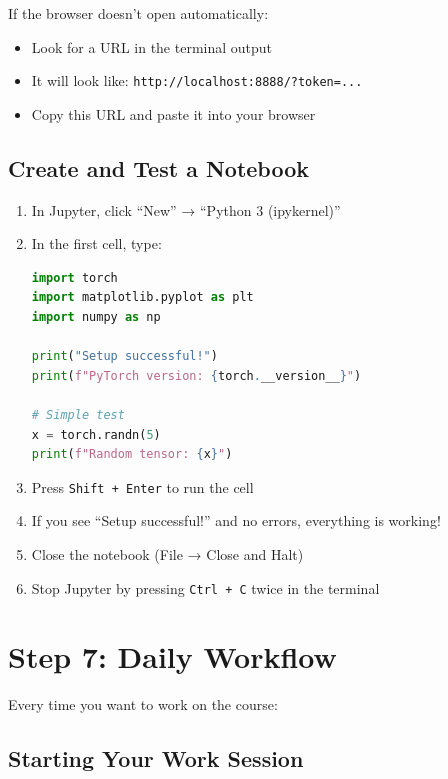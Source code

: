 \documentclass[11pt,a4paper]{article}
\begin{document}
\begin{tipbox}
If the browser doesn't open automatically:
\begin{itemize}
    \item Look for a URL in the terminal output
    \item It will look like: \texttt{http://localhost:8888/?token=...}
    \item Copy this URL and paste it into your browser
\end{itemize}
\end{tipbox}

\subsection{Create and Test a Notebook}

\begin{enumerate}
    \item In Jupyter, click ``New'' → ``Python 3 (ipykernel)''
    
    \item In the first cell, type:
    \begin{lstlisting}[language=Python]
import torch
import matplotlib.pyplot as plt
import numpy as np

print("Setup successful!")
print(f"PyTorch version: {torch.__version__}")

# Simple test
x = torch.randn(5)
print(f"Random tensor: {x}")
    \end{lstlisting}
    
    \item Press \texttt{Shift + Enter} to run the cell
    
    \item If you see ``Setup successful!'' and no errors, everything is working!
    
    \item Close the notebook (File → Close and Halt)
    
    \item Stop Jupyter by pressing \texttt{Ctrl + C} twice in the terminal
\end{enumerate}

\section{Step 7: Daily Workflow}

Every time you want to work on the course:

\subsection{Starting Your Work Session}
\end{document}
